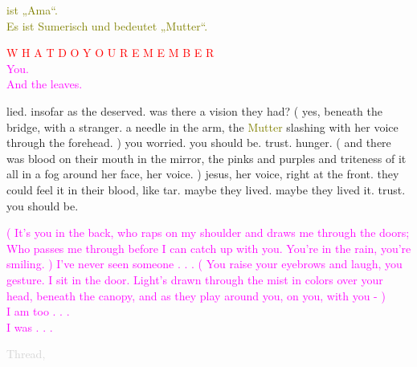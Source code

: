 \documentclass[11pt]{article}
\begin{document}
\begingroup
\begin{center}
\textcolor{olive}{ist „Ama“. \\ Es ist Sumerisch und bedeutet „Mutter“.}
\end{center}
\endgroup

\begingroup
\begin{center}
\textcolor{red}{W H A T \hspace{10mm} D O \hspace{10mm} Y O U \hspace{10mm} R E M E M B E R} \\ \textcolor{magenta}{You. \\ And the leaves. }
\end{center}
\endgroup

\begingroup
lied. insofar as the deserved. was there a vision they had? ( yes, beneath the bridge, with a stranger. a needle in the arm, the \textcolor{olive}{Mutter} slashing with her voice through the forehead. ) you worried. you should be. trust. hunger. ( and there was blood on their mouth in the mirror, the pinks and purples and triteness of it all in a fog around her face, her voice. ) jesus, her voice, right at the front. they could feel it in their blood, like tar. maybe they lived. maybe they lived it. trust. you should be.
\endgroup

\begingroup
\begin{center}
\textcolor{magenta}{( It's you in the back, who raps on my shoulder and draws me through the doors; Who passes me through before I can catch up with you. You're in the rain, you're smiling. ) I've never seen someone . . . ( You raise your eyebrows and laugh, you gesture. I sit in the door. Light's drawn through the mist in colors over your head, beneath the canopy, and as they play around you, on you, with you - ) \\ I am too . . . \\ I was . . .}
\end{center}
\endgroup

\begingroup
\begin{center}
\textcolor{lightgray}{Thread, }
\rightskip\leftskip
\end{center}
\endgroup
\end{document}
